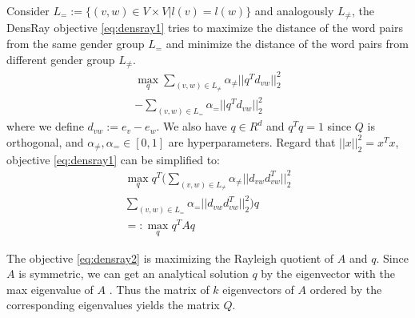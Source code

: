 Consider $L_{=}:=\{(v,w)\in V\times V|l(v)=l(w)\}$ and analogously $L_{\neq}$, the DensRay objective \ref{eq:densray1} tries to maximize the distance of the word pairs from the same gender group $L_{=}$ and minimize the distance of the word pairs from different gender group $L_{\neq}$.
\begin{eqnarray}
    \mathop{max}\limits_{q} 
    \sum_{(v,w)\in L_{\neq}}\alpha_{\neq}||q^Td_{vw}||^2_2\nonumber\\
    -\sum_{(v,w)\in L_{=}}\alpha_{=}||q^Td_{vw}||^2_2
\label{eq:densray1}
\end{eqnarray}
where we define $d_{vw}:=e_v-e_w$. We also have $q\in R^d$ and $q^Tq=1$ since $Q$ is orthogonal, and $\alpha_{\neq},\alpha_{=}\in [0,1]$ are hyperparameters. Regard that $||x||^2_2=x^Tx$, objective \ref{eq:densray1} can be simplified to:
\begin{eqnarray}
    \mathop{max}\limits_{q} q^T(
    \sum_{(v,w)\in L_{\neq}}\alpha_{\neq}||d_{vw}d_{vw}^T||^2_2\nonumber\\
    \sum_{(v,w)\in L_{=}}\alpha_{=}||d_{vw}d_{vw}^T||^2_2)q\nonumber\\
    =:\mathop{max}\limits_{q} q^TAq
\label{eq:densray2}
\end{eqnarray}

The objective \ref{eq:densray2} is maximizing the Rayleigh quotient of $A$ and $q$. Since $A$ is symmetric, we can get an analytical solution $q$ by the eigenvector with the max eigenvalue of $A$ \citep{horn1990matrix}. Thus the matrix of $k$ eigenvectors of $A$ ordered by the corresponding eigenvalues yields the matrix $Q$.
